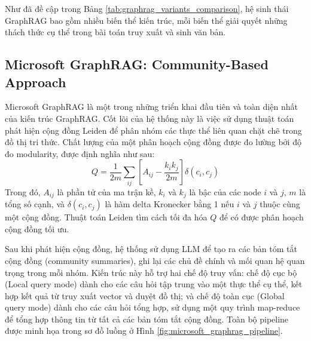 Như đã đề cập trong Bảng \ref{tab:graphrag_variants_comparison}, hệ sinh thái GraphRAG bao gồm nhiều biến thể kiến trúc, mỗi biến thể giải quyết những thách thức cụ thể trong bài toán truy xuất và sinh văn bản.

\subsection{Microsoft GraphRAG: Community-Based Approach}
\label{subsec:microsoft_graphrag}

Microsoft GraphRAG \cite{edge2024graphrag} là một trong những triển khai đầu tiên và toàn diện nhất của kiến trúc GraphRAG. Cốt lõi của hệ thống này là việc sử dụng thuật toán phát hiện cộng đồng Leiden để phân nhóm các thực thể liên quan chặt chẽ trong đồ thị tri thức. Chất lượng của một phân hoạch cộng đồng được đo lường bởi độ đo modularity, được định nghĩa như sau:
\begin{equation}
Q = \frac{1}{2m} \sum_{ij} \left[ A_{ij} - \frac{k_i k_j}{2m} \right] \delta(c_i, c_j)
\label{eq:modularity}
\end{equation}
Trong đó, $A_{ij}$ là phần tử của ma trận kề, $k_i$ và $k_j$ là bậc của các node $i$ và $j$, $m$ là tổng số cạnh, và $\delta(c_i, c_j)$ là hàm delta Kronecker bằng 1 nếu $i$ và $j$ thuộc cùng một cộng đồng. Thuật toán Leiden tìm cách tối đa hóa $Q$ để có được phân hoạch cộng đồng tối ưu.

Sau khi phát hiện cộng đồng, hệ thống sử dụng LLM để tạo ra các bản tóm tắt cộng đồng (community summaries), ghi lại các chủ đề chính và mối quan hệ quan trọng trong mỗi nhóm. Kiến trúc này hỗ trợ hai chế độ truy vấn: chế độ cục bộ (Local query mode) dành cho các câu hỏi tập trung vào một thực thể cụ thể, kết hợp kết quả từ truy xuất vector và duyệt đồ thị; và chế độ toàn cục (Global query mode) dành cho các câu hỏi tổng hợp, sử dụng một quy trình map-reduce để tổng hợp thông tin từ tất cả các bản tóm tắt cộng đồng. Toàn bộ pipeline được minh họa trong sơ đồ luồng ở Hình \ref{fig:microsoft_graphrag_pipeline}.

